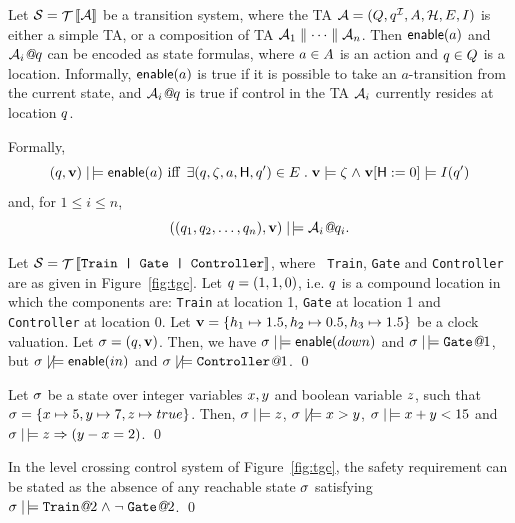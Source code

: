 {Let $\SS = \TSys{\AA}$
be a transition system, where the TA $\AA = (\tglocs, \tgiloc,
\Actions, \tgclks, \tgedges, \tginv)$ is either a simple TA, or a composition
of TA $\AA_1 \parallel \cdots \parallel \AA_n$.  Then
$\mathop{{\sf enable}}(a)$ and $\AA_i \at \tgloc$ can be encoded as state formulas,
where $a \in A$ is an action and $q \in Q$ is a
location. Informally, $\mathop{{\sf enable}}(a)$ is true if it is possible to take
an $a$-transition from the current state, and $\AA_i \at \tgloc$ is
true if control in the TA $\AA_i$ currently resides at location
$q$.

Formally, 
\[ (\tgloc,\clkvl) \smodels \enable(a) \text{ iff } \exists(\tgloc,\tgguard,a,\someclks,\tgloc') \in \tgedges \such \clkvl \models \tgguard \land \clkvl[\someclks := 0] \models \tginv(\tgloc')
\]
and, for $1 \leq i \leq n$,
\[ ((\tgloc_1,\tgloc_2,\ldots,\tgloc_n),\clkvl) \smodels \AA_i \at \tgloc_i.
\]

\begin{exampleb}
Let $\SS = \TSys{\mbox{\tt Train | Gate | Controller}}$, where {\tt
Train}, {\tt Gate} and {\tt Controller} are as given in
Figure~\ref{fig:tgc}.  Let $q = (1,1,0)$, i.e. $q$ is a
compound location in which the components are: {\tt Train} at location
1, {\tt Gate} at location 1 and {\tt Controller} at location 0. Let
$\mathbf{v} = \{h_1 \mapsto 1.5, h_2 \mapsto 0.5, h_3
\mapsto 1.5\}$ be a clock valuation. Let $\sigma = (q,\mathbf{v})$.
Then, we have $\sigma \mathrel{|\!\models} \mathop{{\sf enable}}(down)$ and 
$\sigma \mathrel{|\!\models} \mbox{\tt Gate}\mathord{\hbox{\it @}} 1$, but $\sigma \not\mathrel{|\!\models} \mathop{{\sf enable}}(in)$
and $\sigma \not\mathrel{|\!\models} \mbox{\tt Controller} \mathord{\hbox{\it @}} 1$.
\qed
\end{exampleb}

\begin{exampleb}
Let $\sigma$ be a state over integer variables $x,y$ and 
boolean variable $z$, such that $\sigma = \{x \mapsto 5, y \mapsto 7,
z \mapsto {true}\}$. Then, $\sigma \mathrel{|\!\models} z$, 
$\sigma \not\mathrel{|\!\models} x > y$, $\sigma \mathrel{|\!\models} x + y < 15$ and
$\sigma \mathrel{|\!\models} z \Rightarrow (y - x = 2)$.
\qed
\end{exampleb}

\begin{exampleb}
In the level crossing control system of Figure~\ref{fig:tgc},
the safety requirement can be stated as the absence of any reachable
state $\sigma$ satisfying $\sigma \mathrel{|\!\models} \mbox{\tt Train}\mathord{\hbox{\it @}} 2 \mathrel{\wedge}
\neg\; \mbox{\tt Gate} \mathord{\hbox{\it @}} 2$.
\qed
\end{exampleb}

}
